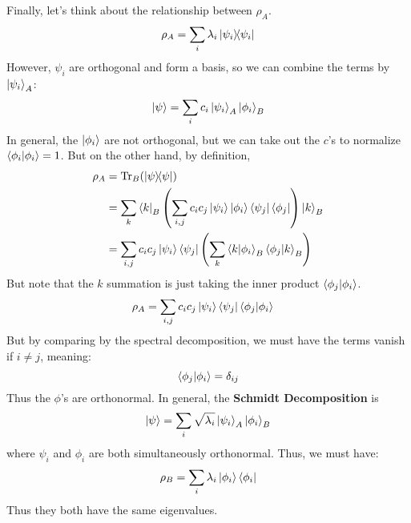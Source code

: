 Finally, let's think about the relationship between $\rho_A$.
\[ \rho_A = \sum_i \lambda_i \ketbra{\psi_i}{\psi_i} \]
However, $\psi_i$ are orthogonal and form a basis, so we can combine the terms by $\ket{\psi_i}_A$:
\[ \ket{\psi} = \sum_i c_i \ket{\psi_i}_{A} \ket{\phi_i}_B \]
In general, the $\ket{\phi_i}$ are not orthogonal, but we can take out the $c$'s to normalize $\braket{\phi_i}{\phi_i} = 1$.
But on the other hand, by definition,
\begin{align*}
    \rho_A &= \Tr_B(\ketbra{\psi}{\psi}) \\
    &= \sum_k \bra{k}_B \qty(\sum_{i,j} c_i c_j \ket{\psi_i} \ket{\phi_i} \bra{\psi_j} \bra{\phi_j}) \ket{k}_B \\
    &= \sum_{i,j} c_i c_j \ket{\psi_i} \bra{\psi_j} \qty(\sum_k  \braket{k}{\phi_i}_B \braket{\phi_j}{k}_B)
\end{align*}
But note that the $k$ summation is just taking the inner product $\braket{\phi_j}{\phi_i}$.
\begin{align*}
    \rho_A &= \sum_{i, j}  c_i c_j \ket{\psi_i}\bra{\psi_j} \braket{\phi_j}{\phi_i}
\end{align*}
But by comparing by the spectral decomposition, we must have the terms vanish if $i \neq j$, meaning:
\[ \braket{\phi_j}{\phi_i} = \delta_{ij} \]
Thus the $\phi$'s are orthonormal. In general, the \textbf{Schmidt Decomposition} is
\[ \ket{\psi} = \sum_i \sqrt{\lambda_i} \ket{\psi_i}_A \ket{\phi_i}_B \]
where $\psi_i$ and $\phi_i$ are both simultaneously orthonormal. Thus, we must have:
\[ \rho_B = \sum_i \lambda_i \ket{\phi_i}\bra{\phi_i} \]
Thus they both have the same eigenvalues.
